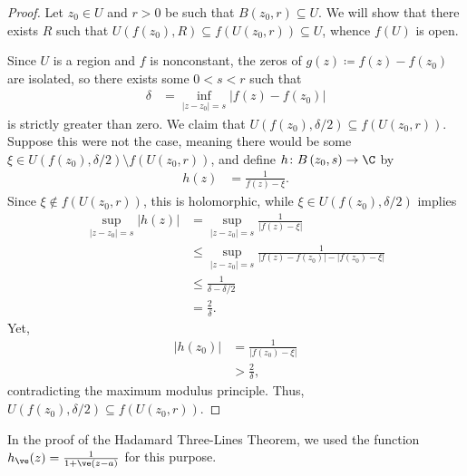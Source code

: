 \documentclass[10pt]{mypackage}
\renewcommand{\coloneq}{\coloneqq}
\begin{document}
\begin{proof}
  Let $z_0\in U$ and $r > 0$ be such that $ B\left( z_0,r \right)\subseteq U $. We will show that there exists $R$ such that $U\left( f\left( z_0 \right),R \right)\subseteq f\left( U\left( z_0,r \right) \right)\subseteq U$, whence $f(U)$ is open.%

  Since $U$ is a region and $f$ is nonconstant, the zeros of $g(z)\coloneq f(z) - f\left( z_0 \right)$ are isolated, so there exists some $0 < s < r$ such that
  \begin{align*}
    \delta &= \inf_{\left\vert z-z_0 \right\vert = s} \left\vert f(z)-f\left( z_0 \right) \right\vert
  \end{align*}
  is strictly greater than zero. We claim that $U\left( f\left( z_0 \right),\delta/2 \right) \subseteq f\left( U\left( z_0,r \right) \right)$. Suppose this were not the case, meaning there would be some $\xi\in U\left( f\left( z_0 \right),\delta/2 \right)\setminus f\left( U\left( z_0,r \right) \right)$, and define $ h\colon B\left( z_0,s \right)\rightarrow \C $ by
  \begin{align*}
    h(z) &= \frac{1}{f\left( z \right) - \xi}.
  \end{align*}
  Since $\xi\notin f\left( U\left( z_0,r \right) \right)$, this is holomorphic, while $\xi\in U\left( f\left( z_0 \right),\delta/2 \right)$ implies
  \begin{align*}
    \sup_{\left\vert z-z_0 \right\vert = s} \left\vert h(z) \right\vert &= \sup_{\left\vert z-z_0 \right\vert = s} \frac{1}{\left\vert f\left( z \right) - \xi \right\vert}\\
                                                                        &\leq \sup_{\left\vert z-z_0 \right\vert = s} \frac{1}{\left\vert f\left( z \right)-f\left( z_0 \right) \right\vert - \left\vert f\left( z_0 \right) - \xi \right\vert}\\
                                                                        &\leq \frac{1}{\delta - \delta/2}\\
                                                                        &= \frac{2}{\delta}.
  \end{align*}
  Yet,
  \begin{align*}
    \left\vert h\left( z_0 \right) \right\vert &= \frac{1}{\left\vert f\left( z_0 \right) - \xi \right\vert}\\
                                               &> \frac{2}{\delta},
  \end{align*}
  contradicting the maximum modulus principle. Thus, $U\left( f\left( z_0 \right),\delta/2 \right)\subseteq f\left( U\left( z_0,r \right) \right)$.
\end{proof}
In the proof of the Hadamard Three-Lines Theorem, we used the function $h_{\ve}(z) = \frac{1}{ 1 + \ve (z-a) }$ for this purpose.
\end{document}
